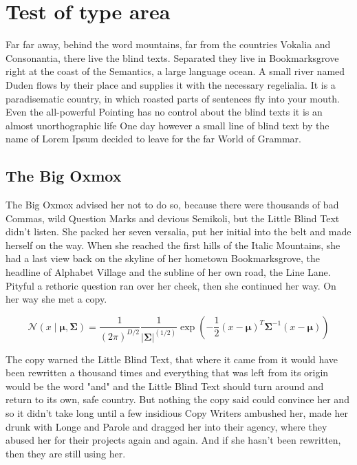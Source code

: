 \chapter{Test of type area}
\label{chap:typeareatest}

Far far away, behind the word mountains, far from the countries Vokalia and Consonantia, there live the blind texts. Separated they live in Bookmarksgrove right at the coast of the Semantics, a large language ocean. A small river named Duden flows by their place and supplies it with the necessary regelialia. It is a paradisematic country, in which roasted parts of sentences fly into your mouth. Even the all-powerful Pointing has no control about the blind texts it is an almost unorthographic life One day however a small line of blind text by the name of Lorem Ipsum decided to leave for the far World of Grammar. 

\section{The Big Oxmox}
\label{sec:typeareatest_ombox}

The Big Oxmox advised her not to do so, because there were thousands of bad Commas, wild Question Marks and devious Semikoli, but the Little Blind Text didn’t listen. She packed her seven versalia, put her initial into the belt and made herself on the way. When she reached the first hills of the Italic Mountains, she had a last view back on the skyline of her hometown Bookmarksgrove, the headline of Alphabet Village and the subline of her own road, the Line Lane. Pityful a rethoric question ran over her cheek, then she continued her way. On her way she met a copy.

\begin{equation}
	\mathcal{N}(x \mid \mathbold{\mu}, \mathbold{\Sigma}) = \frac{1}{(2\pi)^{D/2}} \frac{1}{|\mathbold{\Sigma}|^{(1/2)}} \exp \left( -\frac{1}{2}(x-\mathbold{\mu})^{T}\mathbold{\Sigma}^{-1}(x-\mathbold{\mu}) \right)
\end{equation}

The copy warned the Little Blind Text, that where it came from it would have been rewritten a thousand times and everything that was left from its origin would be the word "and" and the Little Blind Text should turn around and return to its own, safe country. But nothing the copy said could convince her and so it didn’t take long until a few insidious Copy Writers ambushed her, made her drunk with Longe and Parole and dragged her into their agency, where they abused her for their projects again and again. And if she hasn’t been rewritten, then they are still using her.

